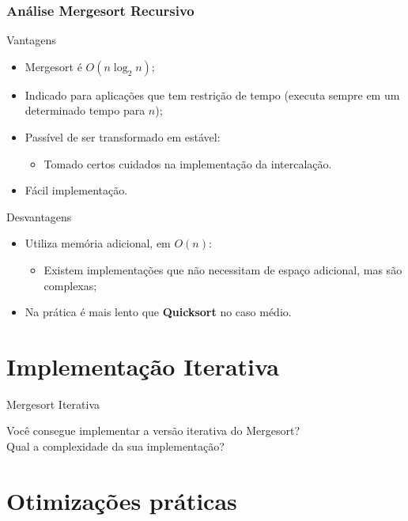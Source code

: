 \documentclass{beamer}
\begin{document}
	\begin{frame}
		\frametitle{Análise Mergesort Recursivo}
	  \begin{block}{Vantagens}
			\begin{itemize}
				\item Mergesort é \textbf{$O(n \log_{2}{n})$};
				\item Indicado para aplicações que tem restrição de tempo (executa sempre em um determinado tempo para \textbf{$n$});
				\item Passível de ser transformado em estável:
					\begin{itemize}
							\item Tomado certos cuidados na implementação da intercalação.
					\end{itemize}
				\item Fácil implementação.
			\end{itemize}
	  \end{block}
	  \begin{block}{Desvantagens}
			\begin{itemize}
				\item Utiliza memória adicional, em \textbf{$O(n)$}:
					\begin{itemize}
							\item Existem implementações que não necessitam de espaço adicional, mas são complexas;
					\end{itemize}
				\item Na prática é mais lento que \textbf{Quicksort} no caso médio.
			\end{itemize}
	  \end{block}
  \end{frame}

	\section{Implementação Iterativa}

	\begin{frame}[c]{Mergesort Iterativa}

		Você consegue implementar a versão iterativa do Mergesort?\\
		Qual a complexidade da sua implementação?

	\end{frame}
	
	\section{Otimizações práticas}
\end{document}
